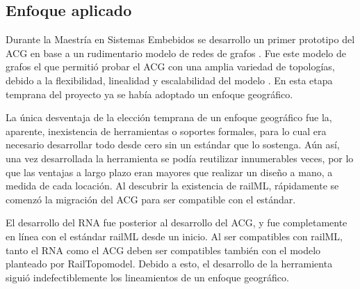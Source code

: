 \subsection{Enfoque aplicado}

    Durante la Maestría en Sistemas Embebidos se desarrollo un primer prototipo del ACG en base a un rudimentario modelo de redes de grafos \cite{Paper_206}. Fue este modelo de grafos el que permitió probar el ACG con una amplia variedad de topologías, debido a la flexibilidad, linealidad y escalabilidad del modelo \cite{Paper_109,Paper_149,Paper_150}. En esta etapa temprana del proyecto ya se había adoptado un enfoque geográfico.

    La única desventaja de la elección temprana de un enfoque geográfico fue la, aparente, inexistencia de herramientas o soportes formales, para lo cual era necesario desarrollar todo desde cero sin un estándar que lo sostenga. Aún así, una vez desarrollada la herramienta se podía reutilizar innumerables veces, por lo que las ventajas a largo plazo eran mayores que realizar un diseño a mano, a medida de cada locación. Al descubrir la existencia de railML, rápidamente se comenzó la migración del ACG para ser compatible con el estándar.

    El desarrollo del RNA fue posterior al desarrollo del ACG, y fue completamente en línea con el estándar railML desde un inicio. Al ser compatibles con railML, tanto el RNA como el ACG deben ser compatibles también con el modelo planteado por RailTopomodel. Debido a esto, el desarrollo de la herramienta siguió indefectiblemente los lineamientos de un enfoque geográfico. 